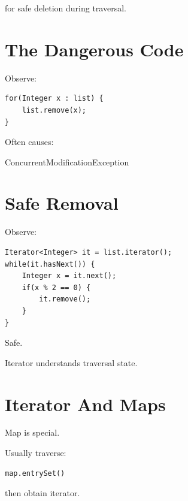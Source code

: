 \documentclass[11pt,a4paper]{book}
\begin{document}
for safe deletion during traversal.

\section{The Dangerous Code}

Observe:

\begin{verbatim} 
for(Integer x : list) {
    list.remove(x);
}
\end{verbatim}

Often causes:

\textcolor{RosettaDeepGreen}{ConcurrentModificationException}

\section{Safe Removal}

Observe:

\begin{verbatim} 
Iterator<Integer> it = list.iterator();
while(it.hasNext()) {
    Integer x = it.next();
    if(x % 2 == 0) {
        it.remove();
    }
}
\end{verbatim}

\textcolor{RosettaSeaGreen}{Safe}.

Iterator understands traversal state.

\section{Iterator And Maps}

Map is special.

Usually traverse:

\begin{verbatim} 
map.entrySet()
\end{verbatim}


then obtain iterator.


\end{document}
